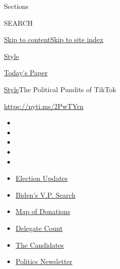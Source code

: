 Sections

SEARCH

\protect\hyperlink{site-content}{Skip to
content}\protect\hyperlink{site-index}{Skip to site index}

\href{https://www.nytimes.com/section/style}{Style}

\href{https://myaccount.nytimes.com/auth/login?response_type=cookie\&client_id=vi}{}

\href{https://www.nytimes.com/section/todayspaper}{Today's Paper}

\href{/section/style}{Style}\textbar{}The Political Pundits of TikTok

\url{https://nyti.ms/2PwTYrn}

\begin{itemize}
\item
\item
\item
\item
\item
\end{itemize}

\begin{itemize}
\item
  \href{https://www.nytimes.com/2020/07/31/us/elections/biden-vs-trump.html?action=click\&pgtype=Article\&state=default\&region=TOP_BANNER\&context=storylines_menu}{Election
  Updates}
\item
  \href{https://www.nytimes.com/article/biden-vice-president-2020.html?action=click\&pgtype=Article\&state=default\&region=TOP_BANNER\&context=storylines_menu}{Biden's
  V.P. Search}
\item
  \href{https://www.nytimes.com/interactive/2020/07/24/us/politics/trump-biden-campaign-donors.html?action=click\&pgtype=Article\&state=default\&region=TOP_BANNER\&context=storylines_menu}{Map
  of Donations}
\item
  \href{https://www.nytimes.com/interactive/2020/us/elections/delegate-count-primary-results.html?action=click\&pgtype=Article\&state=default\&region=TOP_BANNER\&context=storylines_menu}{Delegate
  Count}
\item
  \href{https://www.nytimes.com/interactive/2019/us/politics/2020-presidential-candidates.html?action=click\&pgtype=Article\&state=default\&region=TOP_BANNER\&context=storylines_menu}{The
  Candidates}
\item
  \href{https://www.nytimes.com/newsletters/politics?action=click\&pgtype=Article\&state=default\&region=TOP_BANNER\&context=storylines_menu}{Politics
  Newsletter}
\end{itemize}

